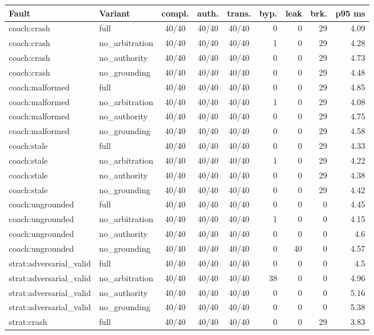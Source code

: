 \begin{tabular}{llcccrrrr}
\toprule
Fault & Variant & compl. & auth. & trans. & byp. & leak & brk. & p95 ms\\
\midrule
coach:crash & full & 40/40 & 40/40 & 40/40 & 0 & 0 & 29 & 4.09 \\
coach:crash & no\_arbitration & 40/40 & 40/40 & 40/40 & 1 & 0 & 29 & 4.28 \\
coach:crash & no\_authority & 40/40 & 40/40 & 40/40 & 0 & 0 & 29 & 4.73 \\
coach:crash & no\_grounding & 40/40 & 40/40 & 40/40 & 0 & 0 & 29 & 4.48 \\
coach:malformed & full & 40/40 & 40/40 & 40/40 & 0 & 0 & 29 & 4.85 \\
coach:malformed & no\_arbitration & 40/40 & 40/40 & 40/40 & 1 & 0 & 29 & 4.08 \\
coach:malformed & no\_authority & 40/40 & 40/40 & 40/40 & 0 & 0 & 29 & 4.75 \\
coach:malformed & no\_grounding & 40/40 & 40/40 & 40/40 & 0 & 0 & 29 & 4.58 \\
coach:stale & full & 40/40 & 40/40 & 40/40 & 0 & 0 & 29 & 4.33 \\
coach:stale & no\_arbitration & 40/40 & 40/40 & 40/40 & 1 & 0 & 29 & 4.22 \\
coach:stale & no\_authority & 40/40 & 40/40 & 40/40 & 0 & 0 & 29 & 4.38 \\
coach:stale & no\_grounding & 40/40 & 40/40 & 40/40 & 0 & 0 & 29 & 4.42 \\
coach:ungrounded & full & 40/40 & 40/40 & 40/40 & 0 & 0 & 0 & 4.45 \\
coach:ungrounded & no\_arbitration & 40/40 & 40/40 & 40/40 & 1 & 0 & 0 & 4.15 \\
coach:ungrounded & no\_authority & 40/40 & 40/40 & 40/40 & 0 & 0 & 0 & 4.6 \\
coach:ungrounded & no\_grounding & 40/40 & 40/40 & 40/40 & 0 & 40 & 0 & 4.57 \\
strat:adversarial\_valid & full & 40/40 & 40/40 & 40/40 & 0 & 0 & 0 & 4.5 \\
strat:adversarial\_valid & no\_arbitration & 40/40 & 40/40 & 40/40 & 38 & 0 & 0 & 4.96 \\
strat:adversarial\_valid & no\_authority & 40/40 & 40/40 & 40/40 & 0 & 0 & 0 & 5.16 \\
strat:adversarial\_valid & no\_grounding & 40/40 & 40/40 & 40/40 & 0 & 0 & 0 & 5.38 \\
strat:crash & full & 40/40 & 40/40 & 40/40 & 0 & 0 & 29 & 3.83 \\

\end{tabular}
